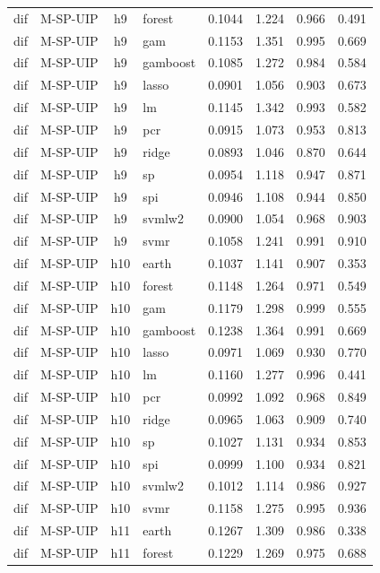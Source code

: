 \begin{ThreePartTable}
\begin{longtable}[t]{llclcccc}
dif & M-SP-UIP & h9 & forest & 0.1044 & 1.224 & 0.966 & 0.491\\
dif & M-SP-UIP & h9 & gam & 0.1153 & 1.351 & 0.995 & 0.669\\
dif & M-SP-UIP & h9 & gamboost & 0.1085 & 1.272 & 0.984 & 0.584\\
dif & M-SP-UIP & h9 & lasso & 0.0901 & 1.056 & 0.903 & 0.673\\
dif & M-SP-UIP & h9 & lm & 0.1145 & 1.342 & 0.993 & 0.582\\
dif & M-SP-UIP & h9 & pcr & 0.0915 & 1.073 & 0.953 & 0.813\\
dif & M-SP-UIP & h9 & ridge & 0.0893 & 1.046 & 0.870 & 0.644\\
dif & M-SP-UIP & h9 & sp & 0.0954 & 1.118 & 0.947 & 0.871\\
dif & M-SP-UIP & h9 & spi & 0.0946 & 1.108 & 0.944 & 0.850\\
dif & M-SP-UIP & h9 & svmlw2 & 0.0900 & 1.054 & 0.968 & 0.903\\
dif & M-SP-UIP & h9 & svmr & 0.1058 & 1.241 & 0.991 & 0.910\\
\addlinespace
dif & M-SP-UIP & h10 & earth & 0.1037 & 1.141 & 0.907 & 0.353\\
dif & M-SP-UIP & h10 & forest & 0.1148 & 1.264 & 0.971 & 0.549\\
dif & M-SP-UIP & h10 & gam & 0.1179 & 1.298 & 0.999 & 0.555\\
dif & M-SP-UIP & h10 & gamboost & 0.1238 & 1.364 & 0.991 & 0.669\\
dif & M-SP-UIP & h10 & lasso & 0.0971 & 1.069 & 0.930 & 0.770\\
dif & M-SP-UIP & h10 & lm & 0.1160 & 1.277 & 0.996 & 0.441\\
dif & M-SP-UIP & h10 & pcr & 0.0992 & 1.092 & 0.968 & 0.849\\
dif & M-SP-UIP & h10 & ridge & 0.0965 & 1.063 & 0.909 & 0.740\\
dif & M-SP-UIP & h10 & sp & 0.1027 & 1.131 & 0.934 & 0.853\\
dif & M-SP-UIP & h10 & spi & 0.0999 & 1.100 & 0.934 & 0.821\\
dif & M-SP-UIP & h10 & svmlw2 & 0.1012 & 1.114 & 0.986 & 0.927\\
dif & M-SP-UIP & h10 & svmr & 0.1158 & 1.275 & 0.995 & 0.936\\
\addlinespace
dif & M-SP-UIP & h11 & earth & 0.1267 & 1.309 & 0.986 & 0.338\\
dif & M-SP-UIP & h11 & forest & 0.1229 & 1.269 & 0.975 & 0.688\\

\end{longtable}
\end{ThreePartTable}
